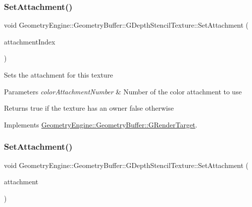 \subsubsection{\texorpdfstring{SetAttachment()}{SetAttachment()}\hspace{0.1cm}{\footnotesize\ttfamily [1/2]}}
{\footnotesize\ttfamily void Geometry\+Engine\+::\+Geometry\+Buffer\+::\+G\+Depth\+Stencil\+Texture\+::\+Set\+Attachment (\begin{DoxyParamCaption}\item[{unsigned int}]{attachment\+Index }\end{DoxyParamCaption})\hspace{0.3cm}{\ttfamily [virtual]}}

Sets the attachment for this texture 
\begin{DoxyParams}{Parameters}
{\em color\+Attachment\+Number} & Number of the color attachment to use \\
\hline
\end{DoxyParams}
\begin{DoxyReturn}{Returns}
true if the texture has an owner false otherwise 
\end{DoxyReturn}


Implements \mbox{\hyperlink{class_geometry_engine_1_1_geometry_buffer_1_1_g_render_target_a1031c44ad374654e2183d3b1b99638a3}{Geometry\+Engine\+::\+Geometry\+Buffer\+::\+G\+Render\+Target}}.

\mbox{\label{class_geometry_engine_1_1_geometry_buffer_1_1_g_depth_stencil_texture_ae8d0ace073861e957f5abe264d2c321d}} 
\subsubsection{\texorpdfstring{SetAttachment()}{SetAttachment()}\hspace{0.1cm}{\footnotesize\ttfamily [2/2]}}
{\footnotesize\ttfamily void Geometry\+Engine\+::\+Geometry\+Buffer\+::\+G\+Depth\+Stencil\+Texture\+::\+Set\+Attachment (\begin{DoxyParamCaption}\item[{G\+Framebuffer\+Commons\+::\+G\+\_\+\+D\+E\+P\+T\+H\+\_\+\+S\+T\+E\+N\+C\+I\+L\+\_\+\+A\+T\+T\+A\+C\+H\+M\+E\+N\+TS}]{attachment }\end{DoxyParamCaption})\hspace{0.3cm}{\ttfamily [virtual]}}

